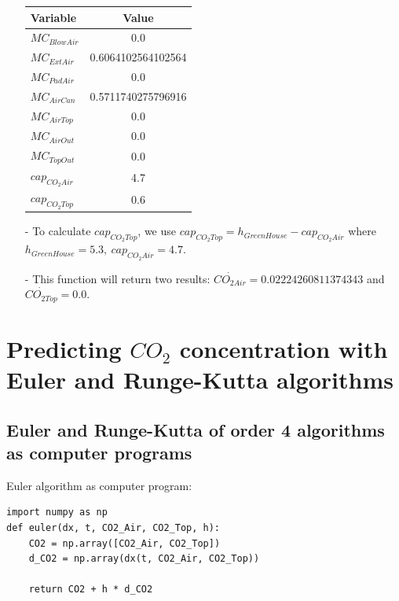 \documentclass[a4paper]{article}
\numberwithin{equation}{section}
\begin{document}
\begin{itemize}
        \begin{table}[H]
          \centering
          \begin{tabular}{@{}lS[table-format=1.17]@{}}
            \toprule
            \textbf{Variable} & \textbf{Value}     \\
            \midrule
            \( MC_{BlowAir} \)  & 0.0                \\
            \( MC_{ExtAir} \)   & 0.6064102564102564 \\
            \( MC_{PadAir} \)   & 0.0                \\
            \( MC_{AirCan} \)   & 0.5711740275796916 \\
            \( MC_{AirTop} \)   & 0.0                \\
            \( MC_{AirOut} \)   & 0.0                \\
            \( MC_{TopOut} \)   & 0.0                \\
            \( cap_{CO_2Air} \) & 4.7                \\
            \( cap_{CO_2Top} \) & 0.6                \\
            \bottomrule
          \end{tabular}
        \end{table}
  \item[-] To calculate \( cap_{CO_2Top} \), we use \( cap_{CO_2Top} = h_{GreenHouse} - cap_{CO_2Air} \) where \( h_{GreenHouse} = 5.3,\ cap_{CO_2Air} = 4.7 \).
  \item[-] This function will return two results: \( \dot{CO_{2Air}} = 0.02224260811374343 \) and \( \dot{CO_{2Top}} = 0.0 \).
\end{itemize}


\newpage
\section{Predicting \texorpdfstring{\( CO_2 \)}{} concentration with Euler and Runge-Kutta algorithms}
\subsection{Euler and Runge-Kutta of order 4 algorithms as computer programs}
Euler algorithm as computer program:
\begin{mdframed}[leftline=false,rightline=false,backgroundcolor=magenta!10,nobreak=true]
  \begin{verbatim}
import numpy as np
def euler(dx, t, CO2_Air, CO2_Top, h):
    CO2 = np.array([CO2_Air, CO2_Top])
    d_CO2 = np.array(dx(t, CO2_Air, CO2_Top))

    return CO2 + h * d_CO2
  \end{verbatim}
\end{mdframed}
\end{document}
